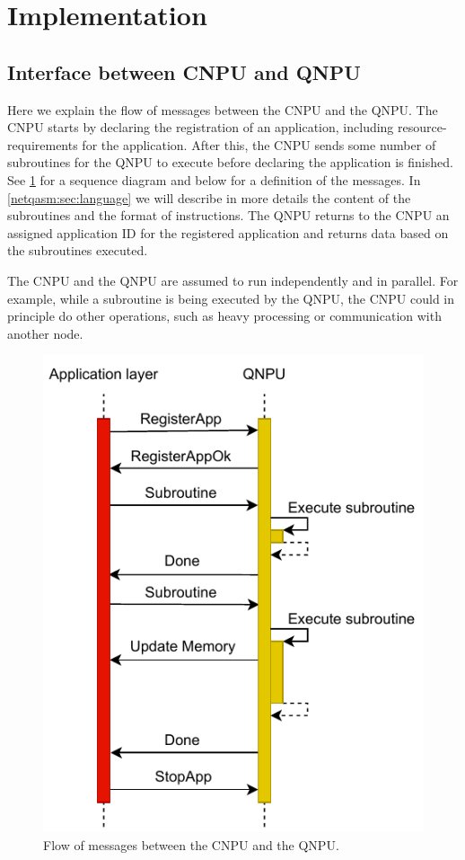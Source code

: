 \section{Implementation}
\label{netqasm:sec:implementation}


\subsection{Interface between \ac{CNPU} and \ac{QNPU}}
Here we explain the flow of messages between the \ac{CNPU} and the \ac{QNPU}.
The \ac{CNPU} starts by declaring the registration of an application, including resource-requirements for the application.
After this, the \ac{CNPU} sends some number of subroutines for the \ac{QNPU} to execute before declaring the application is finished.
See \cref{fig:message_sequence} for a sequence diagram and below for a definition of the messages.
In \cref{netqasm:sec:language} we will describe in more details the content of the subroutines and the format of instructions.
The \ac{QNPU} returns to the \ac{CNPU} an assigned application ID for the registered application and returns data based on the subroutines executed.

The \ac{CNPU} and the \ac{QNPU} are assumed to run independently and in parallel.
For example, while a subroutine is being executed by the \ac{QNPU}, the \ac{CNPU} could in principle do other operations, such as heavy processing or communication with another node.

\begin{figure}
      \centering
      \includegraphics[width=0.6\linewidth]{figures/netqasm/message-flow.pdf}
      \caption{Flow of messages between the \ac{CNPU} and the \ac{QNPU}.}
      \label{fig:message_sequence}
\end{figure}

